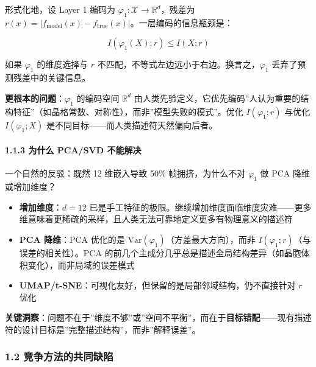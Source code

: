 \documentclass[
  12pt,
]{ctexart}
\providecommand{\tightlist}{%
  \setlength{\itemsep}{0pt}\setlength{\parskip}{0pt}}
\begin{document}
形式化地，设 Layer 1 编码为
\(\varphi_1: \mathcal{X} \rightarrow \mathbb{R}^d\)，残差为
\(r(x) = |f_{\text{model}}(x) - f_{\text{true}}(x)|\)。一层编码的信息瓶颈是：

\[I(\varphi_1(X); r) \leq I(X; r)\]

如果 \(\varphi_1\) 的维度选择与 \(r\)
不匹配，不等式左边远小于右边。换言之，\(\varphi_1\)
丢弃了预测残差中的关键信息。

\textbf{更根本的问题}：\(\varphi_1\) 的编码空间 \(\mathbb{R}^d\)
由人类先验定义，它优先编码''人认为重要的结构特征''（如晶格常数、对称性），而非''模型失败的模式''。优化
\(I(\varphi_1; r)\) 与优化 \(I(\varphi_1; X)\)
是不同目标------而人类描述符天然偏向后者。

\paragraph{1.1.3 为什么 PCA/SVD
不能解决}\label{ux4e3aux4ec0ux4e48-pcasvd-ux4e0dux80fdux89e3ux51b3}

一个自然的反驳：既然 12 维嵌入导致 50\% 帧拥挤，为什么不对 \(\varphi_1\)
做 PCA 降维或增加维度？

\begin{itemize}
\tightlist
\item
  \textbf{增加维度}：\(d=12\)
  已是手工特征的极限。继续增加维度面临维度灾难------更多维意味着更稀疏的采样，且人类无法可靠地定义更多有物理意义的描述符
\item
  \textbf{PCA 降维}：PCA 优化的是
  \(\text{Var}(\varphi_1)\)（方差最大方向），而非
  \(I(\varphi_1; r)\)（与误差的相关性）。PCA
  的前几个主成分几乎总是描述全局结构差异（如晶胞体积变化），而非局域的误差模式
\item
  \textbf{UMAP/t-SNE}：可视化友好，但保留的是局部邻域结构，仍不直接针对
  \(r\) 优化
\end{itemize}

\textbf{关键洞察}：问题不在于''维度不够''或''空间不平衡''，而在于\textbf{目标错配}------现有描述符的设计目标是''完整描述结构''，而非''解释误差''。

\subsubsection{1.2
竞争方法的共同缺陷}\label{ux7adeux4e89ux65b9ux6cd5ux7684ux5171ux540cux7f3aux9677}
\end{document}
